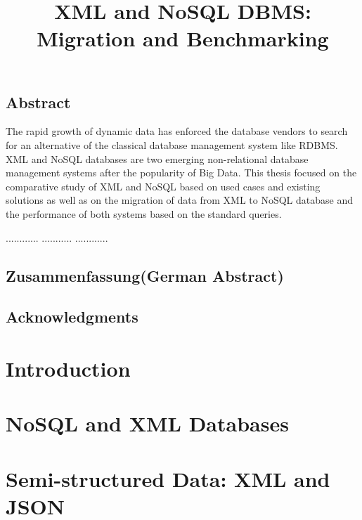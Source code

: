 \documentclass[a4paper,12pt]{book}
\title{XML and NoSQL DBMS: Migration and Benchmarking}
\subtitle{
}
\begin{document}
	\renewcommand{\lstlistingname}{Code}
	\maketitle
	\thispagestyle{empty}
	\newpage
	\section*{Abstract}
	 The rapid growth of dynamic data has enforced the database vendors to search for an alternative of the classical database management system like RDBMS. XML and NoSQL databases are two emerging non-relational database management systems after the popularity of Big Data. This thesis focused on the comparative study of XML and NoSQL based on used cases and existing solutions as well as on the migration of data from XML to NoSQL database and the performance of both systems based on the standard queries.
		
		............
		...........
		............
	
	\section*{Zusammenfassung(German Abstract)}
	
	\section*{Acknowledgments}
	
	\thispagestyle{empty}
	\newpage
	\tableofcontents
	\thispagestyle{empty}
	\newpage
	\chapter{Introduction}
	\setcounter{page}{1}
		
	\chapter{NoSQL and XML Databases}\label{nosql-xml-database}
		
	\chapter{Semi-structured Data: XML and JSON}\label{semi-structure-data}
		
\end{document}
